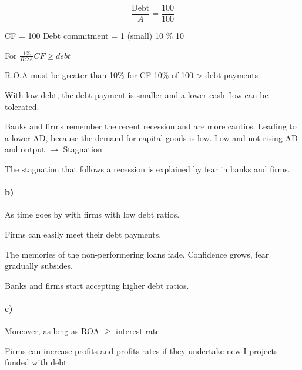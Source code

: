 \documentclass{report}
\begin{document}
$$\frac{\text{Debt}}{A} = \frac{100}{100}$$

CF = 100 
Debt commitment = 1 (small) 10 \% 10

For $\frac{1\%}{ROA} CF \geq debt$

R.O.A must be greater than 10\% for CF 10\% of 100 > debt payments

With low debt, the debt payment is smaller and a lower cash flow can be tolerated.

Banks and firms remember the recent recession and are more cautios. Leading to a lower AD, because the demand for capital goods is low. Low and not rising AD and output $\rightarrow$ Stagnation

The stagnation that follows a recession is explained by fear in banks and firms. 

\paragraph{b)} As time goes by with firms with low debt ratios. 

Firms can easily meet their debt payments. 

The memories of the non-performering loans fade. Confidence grows, fear gradually subsides. 

Banks and firms start accepting higher debt ratios. 

\paragraph{c)} Moreover, as long as ROA $\geq$ interest rate 

Firms can increase profits and profits rates if they undertake new I projects funded with debt:

\begin{figure}[!h]
    \centering
{}
\end{figure}
\end{document}
